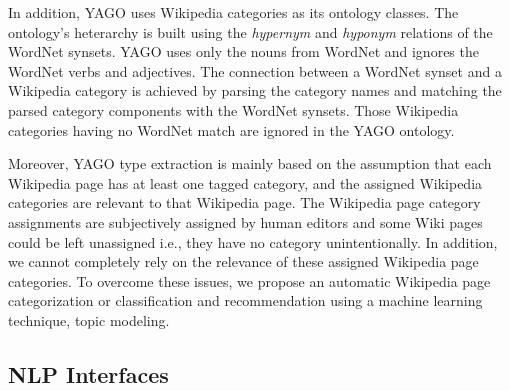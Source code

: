 In addition, YAGO uses Wikipedia categories as its ontology classes. The ontology's heterarchy is built using the \textit{hypernym} and \textit{hyponym} relations of the WordNet synsets. YAGO uses only the nouns from WordNet and ignores the WordNet verbs and adjectives. The connection between a WordNet synset and a Wikipedia category is achieved by parsing the category names and matching the parsed category components with the WordNet synsets\cite{Suchanek2009phd}. Those Wikipedia categories having no WordNet match are ignored in the YAGO ontology.  
  
Moreover, YAGO type extraction is mainly based on the assumption that
each Wikipedia page has at least one tagged category, and the assigned Wikipedia
categories are relevant to that Wikipedia page. The Wikipedia page category assignments are subjectively assigned by human editors and some Wiki pages could be left unassigned i.e., they have no category unintentionally. In addition, we cannot completely rely on the relevance of these assigned Wikipedia page categories. To overcome these issues, we propose an automatic Wikipedia page categorization or classification and recommendation using a machine learning technique, topic modeling. 


\subsection{NLP Interfaces} 
